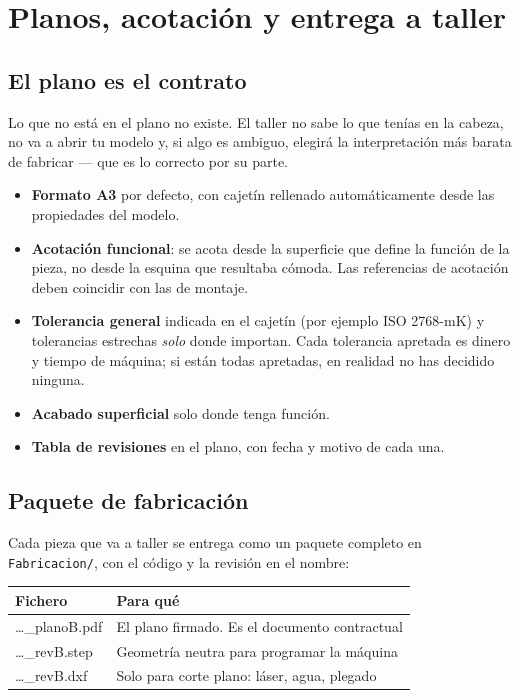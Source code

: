 \section{Planos, acotación y entrega a taller}
\label{sec:herramientas_cad_datos:05}

\subsection{El plano es el contrato}

Lo que no está en el plano no existe. El taller no sabe lo que tenías en la
cabeza, no va a abrir tu modelo y, si algo es ambiguo, elegirá la interpretación
más barata de fabricar --- que es lo correcto por su parte.

\begin{itemize}
  \item \textbf{Formato A3} por defecto, con cajetín rellenado automáticamente
        desde las propiedades del modelo.
  \item \textbf{Acotación funcional}: se acota desde la superficie que define la
        función de la pieza, no desde la esquina que resultaba cómoda. Las
        referencias de acotación deben coincidir con las de montaje.
  \item \textbf{Tolerancia general} indicada en el cajetín (por ejemplo
        ISO 2768-mK) y tolerancias estrechas \emph{solo} donde importan. Cada
        tolerancia apretada es dinero y tiempo de máquina; si están todas
        apretadas, en realidad no has decidido ninguna.
  \item \textbf{Acabado superficial} solo donde tenga función.
  \item \textbf{Tabla de revisiones} en el plano, con fecha y motivo de cada una.
\end{itemize}

\subsection{Paquete de fabricación}

Cada pieza que va a taller se entrega como un paquete completo en
\texttt{Fabricacion/}, con el código y la revisión en el nombre:

\begin{center}
\begin{tabularx}{\textwidth}{@{}lX@{}}
\toprule
\textbf{Fichero} & \textbf{Para qué} \\
\midrule
\ttfamily \ldots\_planoB.pdf  & El plano firmado. Es el documento contractual \\
\ttfamily \ldots\_revB.step   & Geometría neutra para programar la máquina \\
\ttfamily \ldots\_revB.dxf    & Solo para corte plano: láser, agua, plegado \\
\bottomrule
\end{tabularx}
\end{center}

